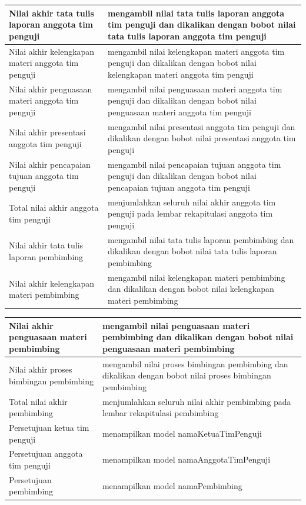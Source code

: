 \begin{itemize}
\begin{table}[H]
\begin{tabular}{| m{5cm} | m{10cm} |}
				\hline
				Nilai akhir tata tulis laporan anggota tim penguji & mengambil nilai tata tulis laporan anggota tim penguji dan dikalikan dengan bobot nilai tata tulis laporan anggota tim penguji\\
				\hline
				Nilai akhir kelengkapan materi anggota tim penguji & mengambil nilai kelengkapan materi anggota tim penguji dan dikalikan dengan bobot nilai kelengkapan materi anggota tim penguji\\
				\hline
				Nilai akhir penguasaan materi anggota tim penguji & mengambil nilai penguasaan materi anggota tim penguji dan dikalikan dengan bobot nilai penguasaan materi anggota tim penguji\\
				\hline
				Nilai akhir presentasi anggota tim penguji & mengambil nilai presentasi anggota tim penguji dan dikalikan dengan bobot nilai presentasi anggota tim penguji\\
				\hline
				Nilai akhir pencapaian tujuan anggota tim penguji & mengambil nilai pencapaian tujuan anggota tim penguji dan dikalikan dengan bobot nilai pencapaian tujuan anggota tim penguji\\
				\hline
				Total nilai akhir anggota tim penguji & menjumlahkan seluruh nilai akhir anggota tim penguji pada lembar rekapitulasi anggota tim penguji\\
				\hline
				Nilai akhir tata tulis laporan pembimbing & mengambil nilai tata tulis laporan pembimbing dan dikalikan dengan bobot nilai tata tulis laporan pembimbing\\
				\hline
				Nilai akhir kelengkapan materi pembimbing & mengambil nilai kelengkapan materi pembimbing dan dikalikan dengan bobot nilai kelengkapan materi pembimbing\\
				\hline
			\end{tabular}
		\end{table}
		\begin{table}
			\centering
			\begin{tabular}{| m{5cm} | m{10cm} |}
				\hline
				Nilai akhir penguasaan materi pembimbing & mengambil nilai penguasaan materi pembimbing dan dikalikan dengan bobot nilai penguasaan materi pembimbing\\
				\hline
				Nilai akhir proses bimbingan pembimbing & mengambil nilai proses bimbingan pembimbing dan dikalikan dengan bobot nilai proses bimbingan pembimbing\\
				\hline
				Total nilai akhir pembimbing & menjumlahkan seluruh nilai akhir pembimbing pada lembar rekapitulasi pembimbing\\
				\hline
				Persetujuan ketua tim penguji & menampilkan model namaKetuaTimPenguji\\
				\hline
				Persetujuan anggota tim penguji & menampilkan model namaAnggotaTimPenguji\\
				\hline
				Persetujuan pembimbing & menampilkan model namaPembimbing\\
				\hline
			\end{tabular}
		\end{table}
	\end{itemize}
	
